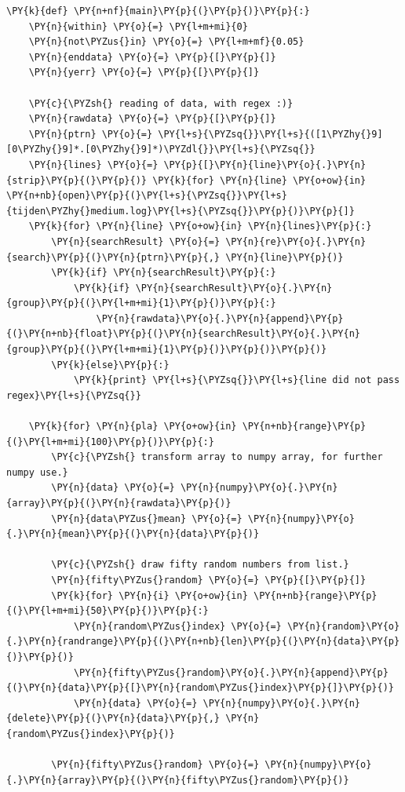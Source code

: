 \documentclass[pdftex,12pt,a4paper]{article}
\begin{document}
\begin{enumerate}
\begin{Verbatim}[commandchars=\\\{\}]
\PY{k}{def} \PY{n+nf}{main}\PY{p}{(}\PY{p}{)}\PY{p}{:}
    \PY{n}{within} \PY{o}{=} \PY{l+m+mi}{0}
    \PY{n}{not\PYZus{}in} \PY{o}{=} \PY{l+m+mf}{0.05}
    \PY{n}{enddata} \PY{o}{=} \PY{p}{[}\PY{p}{]}
    \PY{n}{yerr} \PY{o}{=} \PY{p}{[}\PY{p}{]}

    \PY{c}{\PYZsh{} reading of data, with regex :)}
    \PY{n}{rawdata} \PY{o}{=} \PY{p}{[}\PY{p}{]}
    \PY{n}{ptrn} \PY{o}{=} \PY{l+s}{\PYZsq{}}\PY{l+s}{([1\PYZhy{}9][0\PYZhy{}9]*.[0\PYZhy{}9]*)\PYZdl{}}\PY{l+s}{\PYZsq{}}
    \PY{n}{lines} \PY{o}{=} \PY{p}{[}\PY{n}{line}\PY{o}{.}\PY{n}{strip}\PY{p}{(}\PY{p}{)} \PY{k}{for} \PY{n}{line} \PY{o+ow}{in} \PY{n+nb}{open}\PY{p}{(}\PY{l+s}{\PYZsq{}}\PY{l+s}{tijden\PYZhy{}medium.log}\PY{l+s}{\PYZsq{}}\PY{p}{)}\PY{p}{]}
    \PY{k}{for} \PY{n}{line} \PY{o+ow}{in} \PY{n}{lines}\PY{p}{:}
        \PY{n}{searchResult} \PY{o}{=} \PY{n}{re}\PY{o}{.}\PY{n}{search}\PY{p}{(}\PY{n}{ptrn}\PY{p}{,} \PY{n}{line}\PY{p}{)}
        \PY{k}{if} \PY{n}{searchResult}\PY{p}{:}
            \PY{k}{if} \PY{n}{searchResult}\PY{o}{.}\PY{n}{group}\PY{p}{(}\PY{l+m+mi}{1}\PY{p}{)}\PY{p}{:}
                \PY{n}{rawdata}\PY{o}{.}\PY{n}{append}\PY{p}{(}\PY{n+nb}{float}\PY{p}{(}\PY{n}{searchResult}\PY{o}{.}\PY{n}{group}\PY{p}{(}\PY{l+m+mi}{1}\PY{p}{)}\PY{p}{)}\PY{p}{)}
        \PY{k}{else}\PY{p}{:}
            \PY{k}{print} \PY{l+s}{\PYZsq{}}\PY{l+s}{line did not pass regex}\PY{l+s}{\PYZsq{}}

    \PY{k}{for} \PY{n}{pla} \PY{o+ow}{in} \PY{n+nb}{range}\PY{p}{(}\PY{l+m+mi}{100}\PY{p}{)}\PY{p}{:}
        \PY{c}{\PYZsh{} transform array to numpy array, for further numpy use.}
        \PY{n}{data} \PY{o}{=} \PY{n}{numpy}\PY{o}{.}\PY{n}{array}\PY{p}{(}\PY{n}{rawdata}\PY{p}{)}
        \PY{n}{data\PYZus{}mean} \PY{o}{=} \PY{n}{numpy}\PY{o}{.}\PY{n}{mean}\PY{p}{(}\PY{n}{data}\PY{p}{)}

        \PY{c}{\PYZsh{} draw fifty random numbers from list.}
        \PY{n}{fifty\PYZus{}random} \PY{o}{=} \PY{p}{[}\PY{p}{]}
        \PY{k}{for} \PY{n}{i} \PY{o+ow}{in} \PY{n+nb}{range}\PY{p}{(}\PY{l+m+mi}{50}\PY{p}{)}\PY{p}{:}
            \PY{n}{random\PYZus{}index} \PY{o}{=} \PY{n}{random}\PY{o}{.}\PY{n}{randrange}\PY{p}{(}\PY{n+nb}{len}\PY{p}{(}\PY{n}{data}\PY{p}{)}\PY{p}{)}
            \PY{n}{fifty\PYZus{}random}\PY{o}{.}\PY{n}{append}\PY{p}{(}\PY{n}{data}\PY{p}{[}\PY{n}{random\PYZus{}index}\PY{p}{]}\PY{p}{)}
            \PY{n}{data} \PY{o}{=} \PY{n}{numpy}\PY{o}{.}\PY{n}{delete}\PY{p}{(}\PY{n}{data}\PY{p}{,} \PY{n}{random\PYZus{}index}\PY{p}{)}

        \PY{n}{fifty\PYZus{}random} \PY{o}{=} \PY{n}{numpy}\PY{o}{.}\PY{n}{array}\PY{p}{(}\PY{n}{fifty\PYZus{}random}\PY{p}{)}


\end{Verbatim}
\end{enumerate}
\end{document}
